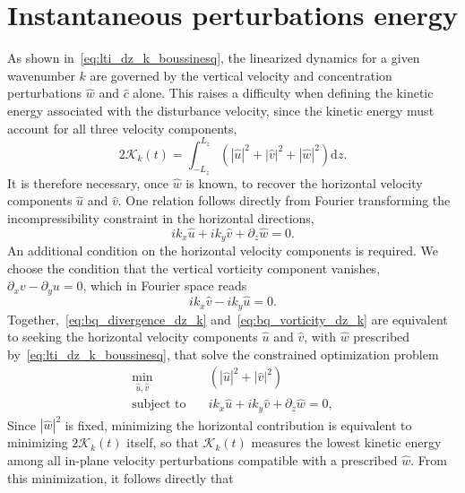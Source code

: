 \section{Instantaneous perturbations energy}%
\label{sec:energy_norm}

As shown in~\eqref{eq:lti_dz_k_boussinesq}, the linearized dynamics for a given wavenumber \(k\) are governed by the vertical velocity and concentration perturbations \(\hat{w}\) and \(\hat{c}\) alone. This raises a difficulty when defining the kinetic energy associated with the disturbance velocity, since the kinetic energy must account for all three velocity components,
\begin{equation}
    \label{eq:bq_kinetic_energy_dz_k}
    2\mathcal{K}_k(t) = \int_{-L_z}^{L_z}\left(|\hat{u}|^{2}+|\hat{v}|^{2}+|\hat{w}|^{2}\right)\mathrm{d}z.
\end{equation}
It is therefore necessary, once \(\hat{w}\) is known, to recover the horizontal velocity components \(\hat{u}\) and \(\hat{v}\). One relation follows directly from Fourier transforming the incompressibility constraint in the horizontal directions,
\begin{equation}
    \label{eq:bq_divergence_dz_k}
    ik_{x}\hat{u}+ik_{y}\hat{v}+\partial_{z}\hat{w} = 0.
\end{equation}
An additional condition on the horizontal velocity components is required. We choose the condition that the vertical vorticity component vanishes, \(\partial_{x}v-\partial_{y}u=0\), which in Fourier space reads
\begin{equation}
    \label{eq:bq_vorticity_dz_k}
    ik_{x}\hat{v}-ik_{y}\hat{u} = 0.
\end{equation}
Together,~\eqref{eq:bq_divergence_dz_k} and~\eqref{eq:bq_vorticity_dz_k} are equivalent to seeking the horizontal velocity components \(\hat{u}\) and \(\hat{v}\), with \(\hat{w}\) prescribed by~\eqref{eq:lti_dz_k_boussinesq}, that solve the constrained optimization problem
\[
\begin{aligned}
    \min_{\hat{u},\hat{v}}\quad & \left(|\hat{u}|^{2}+|\hat{v}|^{2}\right) \\
    \text{subject to} \quad & ik_{x}\hat{u}+ik_{y}\hat{v}+\partial_{z}\hat{w} = 0,
\end{aligned}
\]
Since \(|\hat{w}|^{2}\) is fixed, minimizing the horizontal contribution is equivalent to minimizing \(2\mathcal{K}_k(t)\) itself, so that \(\mathcal{K}_k(t)\) measures the lowest kinetic energy among all in-plane velocity perturbations compatible with a prescribed \(\hat{w}\). From this minimization, it follows directly that
